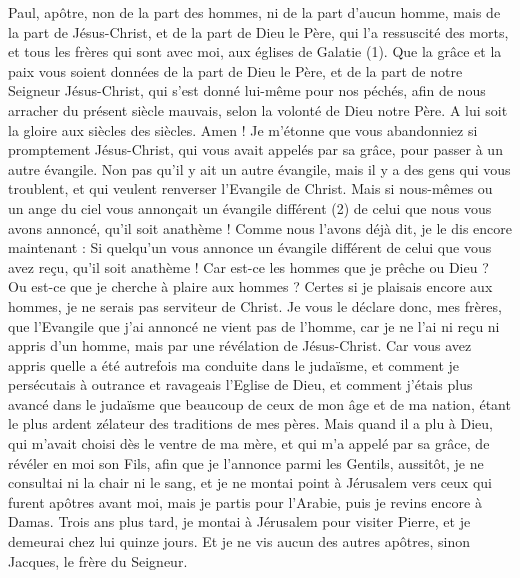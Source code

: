 \BFont
\begin{multicols}{2}
\TextTitle{[Salutations]}
\VerseOne{}Paul, apôtre, non de la part des hommes, ni de la part d'aucun homme, mais de la part de Jésus-Christ, et de la part de Dieu le Père, qui l'a ressuscité des morts,
et tous les frères qui sont avec moi, aux églises de Galatie (1).
Que la grâce et la paix vous soient données de la part de Dieu le Père, et de la part de notre Seigneur Jésus-Christ,
qui s'est donné lui-même pour nos péchés, afin de nous arracher du présent siècle mauvais, selon la volonté de Dieu notre Père.
A lui soit la gloire aux siècles des siècles. Amen !
Je m'étonne que vous abandonniez si promptement Jésus-Christ, qui vous avait appelés par sa grâce, pour passer à un autre évangile.
Non pas qu’il y ait un autre évangile, mais il y a des gens qui vous troublent, et qui veulent renverser l'Evangile de Christ.
Mais si nous-mêmes ou un ange du ciel vous annonçait un évangile différent (2) de celui que nous vous avons annoncé, qu'il soit anathème !
Comme nous l'avons déjà dit, je le dis encore maintenant : Si quelqu'un vous annonce un évangile différent de celui que vous avez reçu, qu'il soit anathème !
Car est-ce les hommes que je prêche ou Dieu ? Ou est-ce que je cherche à plaire aux hommes ? Certes si je plaisais encore aux hommes, je ne serais pas serviteur de Christ.
Je vous le déclare donc, mes frères, que l'Evangile que j'ai annoncé ne vient pas de l’homme,
car je ne l'ai ni reçu ni appris d’un homme, mais par une révélation de Jésus-Christ.
Car vous avez appris quelle a été autrefois ma conduite dans le judaïsme, et comment je persécutais à outrance et ravageais l'Eglise de Dieu,
et comment j’étais plus avancé dans le judaïsme que beaucoup de ceux de mon âge et de ma nation, étant le plus ardent zélateur des traditions de mes pères.
Mais quand il a plu à Dieu, qui m'avait choisi dès le ventre de ma mère, et qui m'a appelé par sa grâce,
de révéler en moi son Fils, afin que je l’annonce parmi les Gentils, aussitôt, je ne consultai ni la chair ni le sang,
et je ne montai point à Jérusalem vers ceux qui furent apôtres avant moi, mais je partis pour l’Arabie, puis je revins encore à Damas.
Trois ans plus tard, je montai à Jérusalem pour visiter Pierre, et je demeurai chez lui quinze jours.
Et je ne vis aucun des autres apôtres, sinon Jacques, le frère du Seigneur.

\end{multicols}
